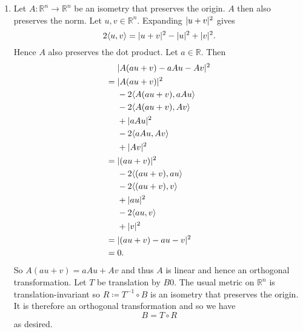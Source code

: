 \documentclass[a4paper, 12pt]{article}
\newcommand{\R}{\mathbb{R}}
\DeclarePairedDelimiter\abs{\lvert}{\rvert}
\begin{document}
\begin{enumerate}
\item Let \(A:\R^n\to\R^n\) be an isometry that preserves the origin. \(A\) then also preserves the norm. Let \(u,v\in\R^n\). Expanding \(\abs{u+v}^2\) gives
\[2\langle u,v\rangle=\abs{u+v}^2-\abs{u}^2+\abs{v}^2.\]
Hence \(A\) also preserves the dot product. Let \(a\in\R\). Then
\begin{align*}
&\abs{A(au+v)-aAu-Av}^2\\
={}&\abs{A(au+v)}^2\\
&-2\langle A(au+v),aAu\rangle\\
&-2\langle A(au+v),Av\rangle\\
&+\abs{aAu}^2\\
&-2\langle aAu,Av\rangle\\
&+\abs{Av}^2\\
={}&\abs{(au+v)}^2\\
&-2\langle (au+v),au\rangle\\
&-2\langle (au+v),v\rangle\\
&+\abs{au}^2\\
&-2\langle au,v\rangle\\
&+\abs{v}^2\\
={}&\abs{(au+v)-au-v}^2\\
={}&0.
\end{align*}
So \(A(au+v)=aAu+Av\) and thus \(A\) is linear and hence an orthogonal transformation. Let \(T\) be translation by \(B0\). The usual metric on \(\R^n\) is translation-invariant so \(R\coloneqq T^{-1}\circ B\) is an isometry that preserves the origin. It is therefore an orthogonal transformation and so we have
\[B=T\circ R\]
as desired.


\end{enumerate}
\end{document}
